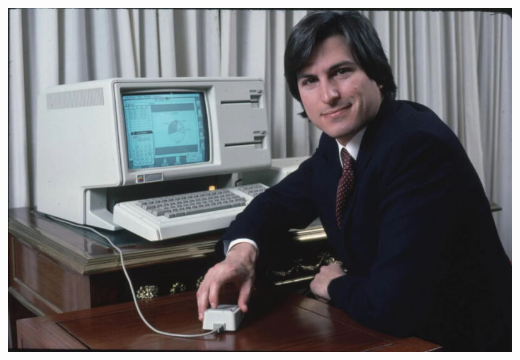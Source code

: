 \vfil
\pagebreak


\begin{center}
	\includegraphics[height=\textheight]{./IMG/steve-jobs-lisa-800x546.jpeg}
\end{center}

\vfill
\pagebreak